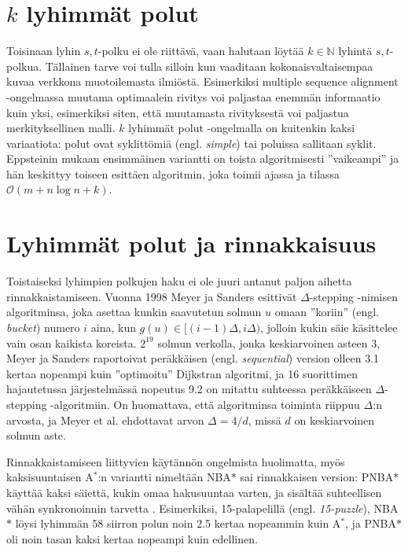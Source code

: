 \documentclass[finnish]{tktltiki2}
\theoremstyle{definition}
\theoremstyle{remark}
\begin{document}
\section{$k$ lyhimmät polut}
Toisinaan lyhin $s, t$-polku ei ole riittävä, vaan halutaan löytää $k \in \mathbb{N}$ lyhintä $s, t$-polkua. Tällainen tarve voi tulla silloin kun vaaditaan kokonaisvaltaisempaa kuvaa verkkona muotoilemasta ilmiöstä. Esimerkiksi multiple sequence alignment -ongelmassa muutama optimaalein rivitys voi paljastaa enemmän informaatio kuin yksi, esimerkiksi siten, että muutamasta rivityksestä voi paljastua merkityksellinen malli. $k$ lyhimmät polut -ongelmalla on kuitenkin kaksi variaatiota: polut ovat syklittömiä (engl. \textit{simple}) tai poluissa sallitaan syklit. Eppsteinin mukaan ensimmäinen variantti on toista algoritmisesti ''vaikeampi'' \cite{Eppstein97} ja hän keskittyy toiseen esittäen algoritmin, joka toimii ajassa ja tilassa $\mathcal{O}(m + n \log n + k)$.

\section{Lyhimmät polut ja rinnakkaisuus}
Toistaiseksi lyhimpien polkujen haku ei ole juuri antanut paljon aihetta rinnakkaistamiseen. Vuonna 1998 Meyer ja Sanders esittivät $\Delta$-stepping -nimisen algoritminsa, joka asettaa kunkin saavutetun solmun $u$ omaan ''koriin'' (engl. \textit{bucket}) numero $i$ aina, kun $g(u) \in [(i - 1)\Delta, i\Delta)$, jolloin kukin säie käsittelee vain osan kaikista koreista. $2^{19}$ solmun verkolla, jonka keskiarvoinen asteen 3, Meyer ja Sanders raportoivat peräkkäisen (engl. \textit{sequential}) version olleen 3.1 kertaa nopeampi kuin ''optimoitu'' Dijkstran algoritmi, ja 16 suorittimen hajautetussa järjestelmässä nopeutus 9.2 on mitattu suhteessa peräkkäiseen $\Delta$-stepping -algoritmiin. On huomattava, että algoritminsa toiminta riippuu $\Delta$:n arvosta, ja Meyer et al. ehdottavat arvon $\Delta = 4/d$, missä $d$ on keskiarvoinen solmun aste.

Rinnakkaistamiseen liittyvien käytännön ongelmista huolimatta, myös kaksisuuntaisen A$^{\ast}$:n variantti nimeltään NBA$\ast$ sai rinnakkaisen version: PNBA$\ast$ käyttää kaksi säiettä, kukin omaa hakusuuntaa varten, ja sisältää suhteellisen vähän synkronoinnin tarvetta \cite{Rios}. Esimerkiksi, 15-palapelillä (engl. \textit{15-puzzle}), NBA$\ast$ löysi lyhimmän 58 siirron polun noin 2.5 kertaa nopeammin kuin A$^{\ast}$, ja PNBA$\ast$ oli noin tasan kaksi kertaa nopeampi kuin edellinen.
\end{document}
